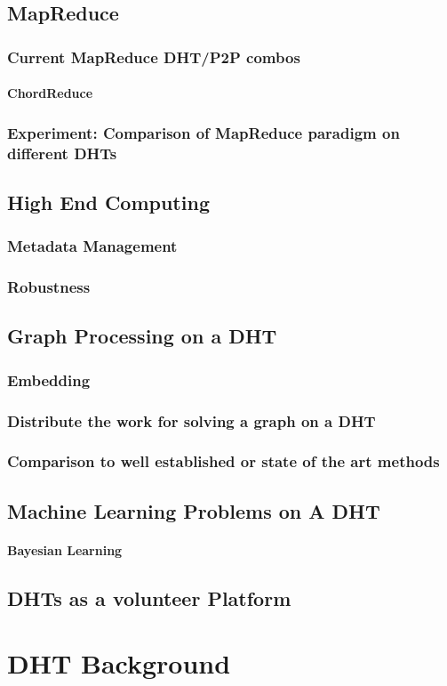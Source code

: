 \documentclass[10pt,letterpaper]{report}
\begin{document}
\section{MapReduce}
\subsection{Current MapReduce DHT/P2P combos}
\subsubsection{ChordReduce}
\subsection{Experiment: Comparison of MapReduce paradigm on different DHTs}


\section{High End Computing}
\subsection{Metadata Management}
\subsection{Robustness}

\section{Graph Processing on a DHT}
\subsection{Embedding}
\subsection{Distribute the work for solving a graph on a DHT}
\subsection{Comparison to well established or state of the art methods}

\section{Machine Learning Problems on A DHT}
\subsubsection{Bayesian Learning}

\section{DHTs as a volunteer Platform}

\chapter{DHT Background}





\end{document}
